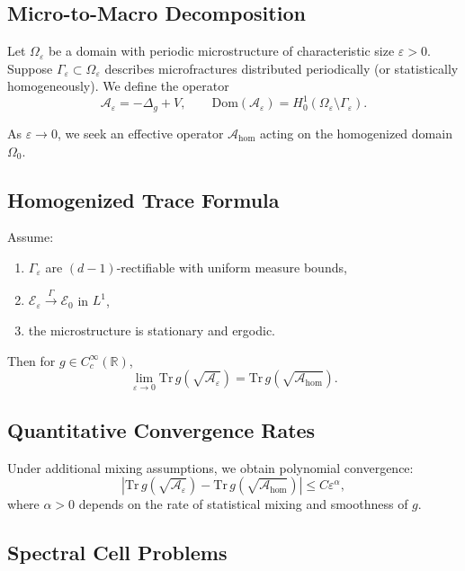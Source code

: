 \subsection{Micro-to-Macro Decomposition}

Let $\Omega_\varepsilon$ be a domain with periodic microstructure of characteristic size $\varepsilon > 0$.  
Suppose $\Gamma_\varepsilon \subset \Omega_\varepsilon$ describes microfractures distributed periodically (or statistically homogeneously).  
We define the operator
\[
\mathcal{A}_\varepsilon = -\Delta_g + V, \qquad \mathrm{Dom}(\mathcal{A}_\varepsilon) = H^1_0(\Omega_\varepsilon \setminus \Gamma_\varepsilon).
\]

As $\varepsilon \to 0$, we seek an effective operator $\mathcal{A}_{\mathrm{hom}}$ acting on the homogenized domain $\Omega_0$.

\subsection{Homogenized Trace Formula}

\begin{theorem}
\label{thm:homogenized-trace}
Assume:
\begin{enumerate}[label=(\roman*)]
  \item $\Gamma_\varepsilon$ are $(d-1)$-rectifiable with uniform measure bounds,  
  \item $\mathcal{E}_\varepsilon \xrightarrow{\Gamma} \mathcal{E}_0$ in $L^1$,  
  \item the microstructure is stationary and ergodic.  
\end{enumerate}
Then for $g \in C^\infty_c(\mathbb{R})$,
\[
\lim_{\varepsilon \to 0} \mathrm{Tr}\, g(\sqrt{\mathcal{A}_\varepsilon}) =
\mathrm{Tr}\, g(\sqrt{\mathcal{A}_{\mathrm{hom}}}).
\]
\end{theorem}

\subsection{Quantitative Convergence Rates}

Under additional mixing assumptions, we obtain polynomial convergence:
\[
\left| \mathrm{Tr}\, g(\sqrt{\mathcal{A}_\varepsilon}) - \mathrm{Tr}\, g(\sqrt{\mathcal{A}_{\mathrm{hom}}}) \right|
\leq C \varepsilon^\alpha,
\]
where $\alpha > 0$ depends on the rate of statistical mixing and smoothness of $g$.

\subsection{Spectral Cell Problems}

